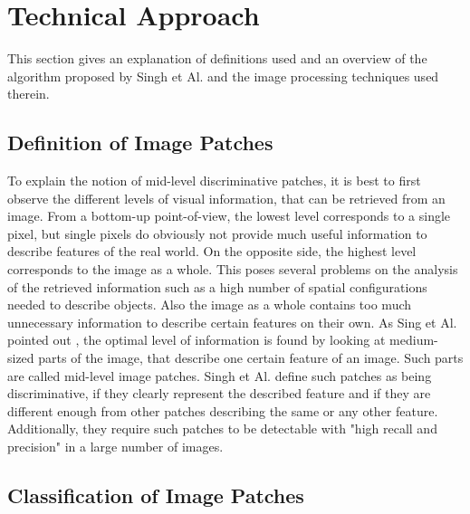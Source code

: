 
\section{Technical Approach}\label{sec:StateArt}

This section gives an explanation of definitions used and an overview of the algorithm proposed by Singh et Al. \cite{Singh2012DiscPat} and the image processing techniques used therein.

\subsection{Definition of Image Patches}

To explain the notion of mid-level discriminative patches, it is best to first observe the different levels of visual information, that can be retrieved from an image. From a bottom-up point-of-view, the lowest level corresponds to a single pixel, but single pixels do obviously not provide much useful information to describe features of the real world. On the opposite side, the highest level corresponds to the image as a whole. This poses several problems on the analysis of the retrieved information such as a high number of spatial configurations needed to describe objects. Also the image as a whole contains too much unnecessary information to describe certain features on their own. As Sing et Al. pointed out \cite{Singh2012DiscPat}, the optimal level of information is found by looking at medium-sized parts of the image, that describe one certain feature of an image. Such parts are called mid-level image patches. Singh et Al. \cite{Singh2012DiscPat} define such patches as being discriminative, if they clearly represent the described feature and if they are different enough from other patches describing the same or any other feature. Additionally, they require such patches to be detectable with "high recall and precision" in a large number of images.

\subsection{Classification of Image Patches}

